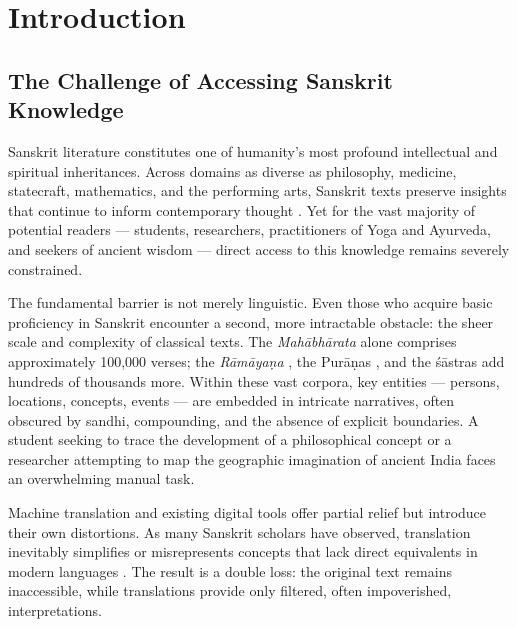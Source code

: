 
\chapter{Introduction}
\label{chap:introduction}

\section{The Challenge of Accessing Sanskrit Knowledge}
\label{sec:challenge}

Sanskrit literature constitutes one of humanity's most profound intellectual and spiritual inheritances. Across domains as diverse as philosophy, medicine, statecraft, mathematics, and the performing arts, Sanskrit texts preserve insights that continue to inform contemporary thought \cite{pollock2006language}. Yet for the vast majority of potential readers — students, researchers, practitioners of Yoga and Ayurveda, and seekers of ancient wisdom — direct access to this knowledge remains severely constrained.

The fundamental barrier is not merely linguistic. Even those who acquire basic proficiency in Sanskrit encounter a second, more intractable obstacle: the sheer scale and complexity of classical texts. The \textit{Mahābhārata} \cite{mahabharata, brockington1998epics} alone comprises approximately 100,000 verses; the \textit{Rāmāyaṇa} \cite{ramayana}, the Purāṇas \cite{purana}, and the śāstras \cite{sastras} add hundreds of thousands more. Within these vast corpora, key entities — persons, locations, concepts, events — are embedded in intricate narratives, often obscured by sandhi, compounding, and the absence of explicit boundaries. A student seeking to trace the development of a philosophical concept or a researcher attempting to map the geographic imagination of ancient India faces an overwhelming manual task.

Machine translation and existing digital tools offer partial relief but introduce their own distortions. As many Sanskrit scholars have observed, translation inevitably simplifies or misrepresents concepts that lack direct equivalents in modern languages \cite{halbfass1991tradition}. The result is a double loss: the original text remains inaccessible, while translations provide only filtered, often impoverished, interpretations.

